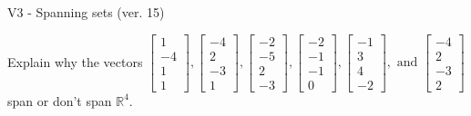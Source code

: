 \begin{exercise}
  \begin{exerciseTitle}V3 - Spanning sets (ver. 15)\end{exerciseTitle}
  \begin{exerciseStatement}
    Explain why the vectors \(\left[\begin{array}{r}
1 \\
-4 \\
1 \\
1
\end{array}\right] , \left[\begin{array}{r}
-4 \\
2 \\
-3 \\
1
\end{array}\right] , \left[\begin{array}{r}
-2 \\
-5 \\
2 \\
-3
\end{array}\right] , \left[\begin{array}{r}
-2 \\
-1 \\
-1 \\
0
\end{array}\right] , \left[\begin{array}{r}
-1 \\
3 \\
4 \\
-2
\end{array}\right] , \text{ and } \left[\begin{array}{r}
-4 \\
2 \\
-3 \\
2
\end{array}\right]\) span or don't span \(\mathbb{R}^4\). 
	



\end{exerciseStatement}
\end{exercise}
